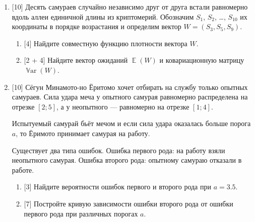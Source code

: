 \documentclass[12pt]{article}
\DeclareMathOperator{\Var}{\mathbb{V}ar}
\DeclareMathOperator{\E}{\mathbb{E}}
\begin{document}
\begin{enumerate}
    \item {[10]} Десять самураев случайно независимо друг от друга встали равномерно вдоль аллеи единичной длины из криптомерий. 
    Обозначим $S_1$, $S_2$, \dots, $S_{10}$ их координаты в порядке возрастания и определим вектор $W = (S_3, S_5, S_9)$.
    \begin{enumerate}
        \item {[4]} Найдите совместную функцию плотности вектора $W$.
        \item {[2 + 4]} Найдите вектор ожиданий $\E(W)$ и ковариационную матрицу $\Var(W)$.
    \end{enumerate}

    \item {[10]} Сёгун Минамото-но Ёритомо хочет отбирать на службу только опытных самураев. 
    Сила удара меча у опытного самурая равномерно распределена на отрезке $[2; 5]$,
    а у неопытного — равномерно на отрезке $[1; 4]$.

    Испытуемый самурай бьёт мечом и если сила удара оказалась больше порога $a$, то Ёримото принимает самурая на работу.

    Существует два типа ошибок. 
    Ошибка первого рода: на работу взяли неопытного самурая. 
    Ошибка второго рода: опытному самураю отказали в работе. 

    \begin{enumerate}
        \item {[3]} Найдите вероятности ошибок первого и второго рода при $a = 3.5$.
        \item {[7]} Постройте кривую зависимости ошибки второго рода от ошибки первого рода при различных порогах $a$.
    \end{enumerate}


\end{enumerate}
    
\end{document}

